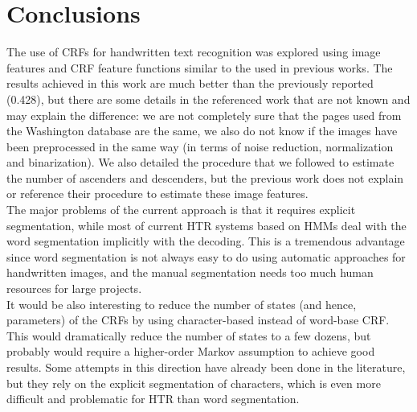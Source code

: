 \documentclass[10pt,a4paper]{article}
\begin{document}
\section{Conclusions}
The use of CRFs for handwritten text recognition was explored using image features and CRF feature functions similar to the used in previous works\cite{feng2006exploring}. The results achieved in this work are much better than the previously reported (0.428), but there are some details in the referenced work that are not known and may explain the difference: we are not completely sure that the pages used from the Washington database are the same, we also do not know if the images have been preprocessed in the same way (in terms of noise reduction, normalization and binarization). We also detailed the procedure that we followed to estimate the number of ascenders and descenders, but the previous work does not explain or reference their procedure to estimate these image features.\\

The major problems of the current approach is that it requires explicit segmentation, while most of current HTR systems based on HMMs deal with the word segmentation implicitly with the decoding. This is a tremendous advantage since word segmentation is not always easy to do using automatic approaches for handwritten images, and the manual segmentation needs too much human resources for large projects.\\

It would be also interesting to reduce the number of states (and hence, parameters) of the CRFs by using character-based instead of word-base CRF. This would dramatically reduce the number of states to a few dozens, but probably would require a higher-order Markov assumption to achieve good results. Some attempts in this direction have already been done in the literature\cite{shetty2007handwritten}, but they rely on the explicit segmentation of characters, which is even more difficult and problematic for HTR than word segmentation.\\



\end{document}
